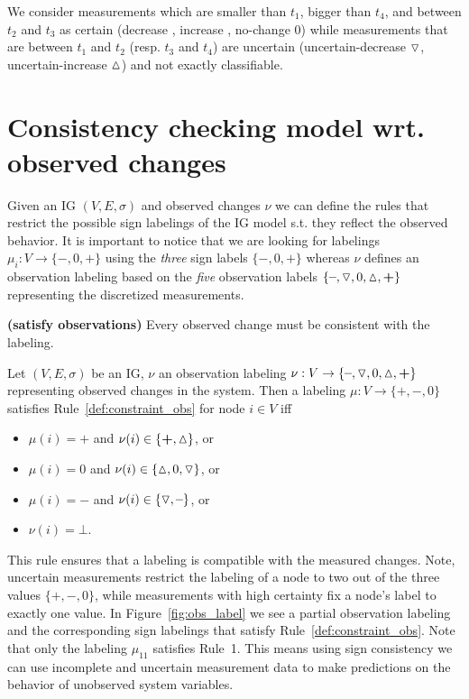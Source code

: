 We consider measurements which are smaller than $t_1$, bigger than $t_4$, and between $t_2$ and $t_3$
 as certain (decrease \minus, increase \plus, no-change 0)
 while measurements that are between $t_1$ and $t_2$ (resp. $t_3$ and $t_4$) are uncertain
 (uncertain-decrease $\triangledown$, uncertain-increase $\vartriangle$) and not exactly classifiable. 

\section*{Consistency checking model wrt. observed changes}
 
Given an IG $(V,E,\sigma)$ 
 and observed changes $\nu$ 
 we can define the rules that restrict the possible sign labelings of the IG model s.t. they reflect the observed behavior.
It is important to notice that we are looking for labelings $\mu_i: V \rightarrow \{ \minus, 0, \plus \}$
 using the \emph{three} sign labels $\{\minus,0,\plus\}$
 whereas $\nu$ defines an observation labeling
 based on the \emph{five} observation labels  $\{ \minus, \uncertaindecrease, 0, \uncertainincrease, \plus \}$
 representing the discretized measurements.

\begin{srule}\label{def:constraint_obs}{\bf (satisfy observations)}
Every observed change must be consistent with the labeling.

Let $(V,E,\sigma)$ be an IG, $\nu$ an observation labeling $\nu: V \rightarrow \{ \minus, \uncertaindecrease, 0, \uncertainincrease, \plus \}$
 representing observed changes in the system.
Then a labeling $\mu : V \rightarrow \{\plus,\minus,0\}$ satisfies Rule~\ref{def:constraint_obs} for node $i\in V$
 iff
 \begin{itemize}
  \item $\mu(i)=\plus$ and $\nu(i)\in \{ \plus, \uncertainincrease \}$, or
  \item $\mu(i)=0$ and $\nu(i)\in \{ \vartriangle, 0, \triangledown\}$, or
  \item $\mu(i)=\minus$ and $\nu(i) \in \{ \uncertaindecrease, \minus \}$, or
  \item $\nu(i)= \bot$.  
 \end{itemize}

\end{srule}
%
This rule ensures that a labeling is compatible with the measured changes.
Note, uncertain measurements restrict the labeling of a node to two out of the three values $\{\plus, \minus, 0\}$,
while measurements with high certainty fix a node's label to exactly one value.
In Figure~\ref{fig:obs_label} we see a partial observation labeling and the corresponding sign labelings 
 that satisfy Rule~\ref{def:constraint_obs}.
Note that only the labeling $\mu_{11}$ satisfies Rule~1.
This means using sign consistency we can use incomplete and uncertain measurement data to make predictions on the behavior of unobserved system variables.

